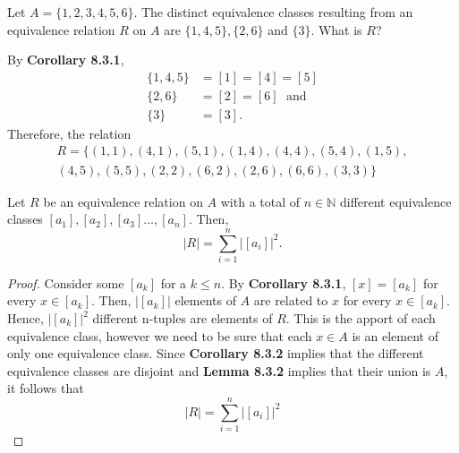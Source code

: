 \documentclass[12pt]{article}
\newcommand{\N}{\mathbb{N}}
\newenvironment{problem}[2][Problem]{\begin{trivlist}
		\item[\hskip \labelsep {\bfseries #1}\hskip \labelsep {\bfseries #2.}]}{\end{trivlist}}
\newenvironment{corollary}[2][Corollary]{\begin{trivlist}
		\item[\hskip \labelsep {\bfseries #1}\hskip \labelsep {\bfseries #2.}]}{\end{trivlist}}
\newenvironment{solution}[2][Solution]{\begin{trivlist}
		\item[\hskip \labelsep {\bfseries #1}\hskip \labelsep {\bfseries #2.}]}{\end{trivlist}}
\begin{document}
	\begin{problem}{26}
		Let $A=\{1,2,3,4,5,6\}$. The distinct equivalence classes resulting from an equivalence relation $R$ on $A$ are $\{1,4,5\}, \{2,6\}$ and $\{3\}$. What is $R$?
		\begin{solution}{26}
			By \textbf{Corollary 8.3.1},
			\begin{align*}
				 \{1,4,5\} &= [1] = [4] = [5]\\
				 \{2,6\} &= [2] = [6] \; \text{ and}\\
				 \{3\} &= [3].
			\end{align*}
			Therefore, the relation
			\begin{align*}
				R=\{(1,1),(4,1),(5,1),(1,4),(4,4),(5,4),(1,5),\\ (4,5),(5,5),(2,2),(6,2),(2,6),(6,6),(3,3)\}
			\end{align*}
		\end{solution}
	\end{problem}

	\begin{corollary}{8.3.3}
		Let $R$ be an equivalence relation on $A$ with a total of $n\in \N$ different equivalence classes $[a_{1}],[a_{2}],[a_{3}]\ldots, [a_{n}]$. Then, 
		\begin{equation*}
			|R| = \sum_{i=1}^{n} \left|[a_{i}]\right|^{2}.
		\end{equation*}
		\begin{proof}
			Consider some $[a_{k}]$ for a $k\leq n$. By \textbf{Corollary 8.3.1}, $[x] = [a_{k}]$ for every $x\in [a_{k}]$. Then, $|[a_{k}]|$ elements of $A$ are related to $x$ for every $x\in [a_{k}]$. Hence, $|[a_{k}]|^{2}$ different n-tuples are elements of $R$. This is the apport of each equivalence class, however we need to be sure that each $x\in A$ is an element of only one equivalence class. Since \textbf{Corollary 8.3.2} implies that the different equivalence classes are disjoint and \textbf{Lemma 8.3.2} implies that their union is $A$, it follows that
			\begin{equation*}
				|R| = \sum_{i=1}^{n} \left|[a_{i}]\right|^{2}
			\end{equation*}
		\end{proof}
	\end{corollary}
\end{document}
